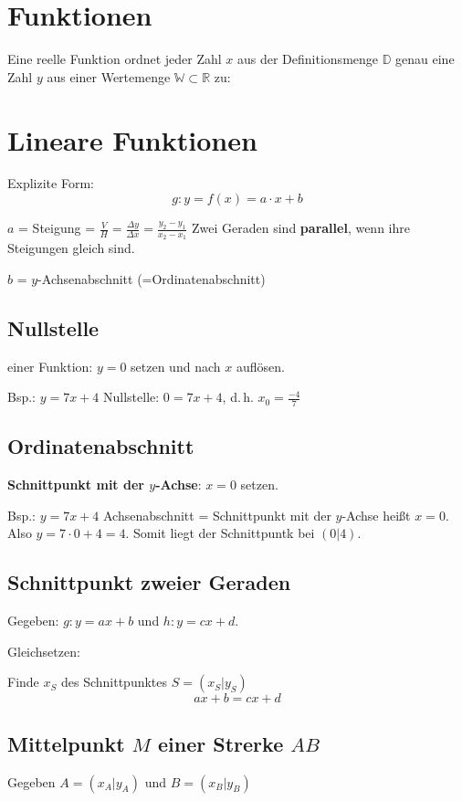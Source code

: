 \begin{multicols}{2}
\section{Funktionen}

Eine reelle Funktion ordnet jeder Zahl $x$ aus der Definitionsmenge
$\mathbb{D}$ genau eine Zahl $y$ aus einer Wertemenge
$\mathbb{W} \subset \mathbb{R}$ zu:


\section{Lineare Funktionen}
Explizite Form:
$$g: y = f(x) = a\cdot{}x + b$$

$a$ = Steigung = $\frac{V}{H}=\frac{\Delta y}{\Delta x} = \frac{y_2-y_1}{x_2-x_1}$
Zwei Geraden sind \textbf{parallel}, wenn ihre Steigungen gleich sind.

$b$ = $y$-Achsenabschnitt (=Ordinatenabschnitt)


\subsection{Nullstelle} einer Funktion: $y=0$ setzen und nach $x$
auf\/lösen.

Bsp.: $y=7x+4$ Nullstelle: $0 = 7x+4$, d.\,h. $x_0=\frac{-4}{7}$

\subsection{Ordinatenabschnitt}
\textbf{Schnittpunkt mit der $y$-Achse}: $x=0$ setzen.

Bsp.: $y=7x+4$ Achsenabschnitt = Schnittpunkt mit der $y$-Achse heißt
$x=0$. Also $y=7\cdot{}0 + 4 = 4$. Somit liegt der Schnittpuntk bei $(0|4)$.


\subsection{Schnittpunkt zweier Geraden}
Gegeben: $g: y=ax+b$ und $h: y=cx+d$.

Gleichsetzen:

Finde $x_S$ des Schnittpunktes $S=(x_S|y_S)$
$$ax+b = cx+d$$

\subsection{Mittelpunkt $M$ einer Strerke $AB$}
Gegeben $A=(x_A|y_A)$ und $B=(x_B|y_B)$


\end{multicols}
